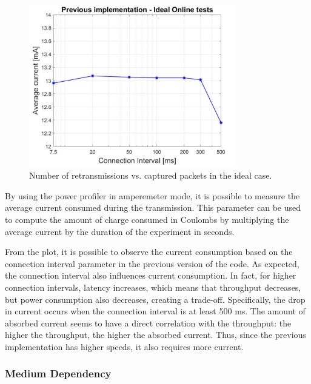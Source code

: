 \documentclass{Configuration_Files/PoliMi3i_thesis}
\begin{document}
\begin{figure}[H]
    \centering
    \includegraphics[width=0.8\textwidth]{Results Manuel/figure6}
    \caption{Number of retransmissions vs. captured packets in the ideal case.}
    \label{fig:figure1}
\end{figure}

By using the power profiler in amperemeter mode, it is possible to measure the average current consumed during the transmission. This parameter can be used to compute the amount of charge consumed in Coulombs by multiplying the average current by the duration of the experiment in seconds.

From the plot, it is possible to observe the current consumption based on the connection interval parameter in the previous version of the code. As expected, the connection interval also influences current consumption. In fact, for higher connection intervals, latency increases, which means that throughput decreases, but power consumption also decreases, creating a trade-off. Specifically, the drop in current occurs when the connection interval is at least 500 ms. The amount of absorbed current seems to have a direct correlation with the throughput: the higher the throughput, the higher the absorbed current. Thus, since the previous implementation has higher speeds, it also requires more current.

\subsubsection*{Medium Dependency}
\end{document}

